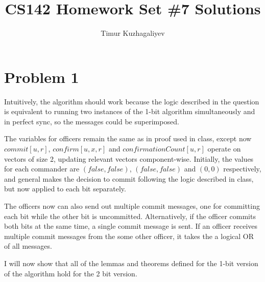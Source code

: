 \documentclass[10pt,letter]{article}
\begin{document}
\title{CS142 Homework Set \#7 Solutions}

\author{Timur Kuzhagaliyev}

 
\maketitle 

\section*{Problem 1}

Intuitively, the algorithm should work because the logic described in the question is equivalent to running two instances of the 1-bit algorithm simultaneously and in perfect sync, so the messages could be superimposed.

The variables for officers remain the same as in proof used in class, except now $commit[u, r]$, $confirm[u, x, r]$ and $confirmationCount[u,r]$ operate on vectors of size 2, updating relevant vectors component-wise. Initially, the values for each commander are $(false, false)$, $(false, false)$ and $(0, 0)$ respectively, and general makes the decision to commit following the logic described in class, but now applied to each bit separately.

The officers now can also send out multiple commit messages, one for committing each bit while the other bit is uncommitted. Alternatively, if the officer commits both bits at the same time, a single commit message is sent. If an officer receives multiple commit messages from the some other officer, it takes the a logical OR of all messages.

I will now show that all of the lemmas and theorems defined for the 1-bit version of the algorithm hold for the 2 bit version.
\end{document}

